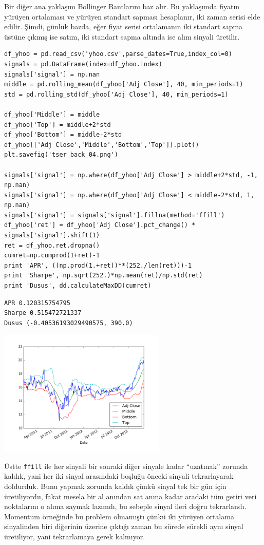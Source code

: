 \documentclass[12pt,fleqn]{article}\usepackage{../../common}
\begin{document}
Bir diğer ana yaklaşım Bollinger Bantlarını baz alır. Bu yaklaşımda fiyatın
yürüyen ortalaması ve yürüyen standart sapması hesaplanır, iki zaman serisi elde
edilir. Şimdi, günlük bazda, eğer fiyat serisi ortalamanın iki standart sapma
üstüne çıkmış ise satım, iki standart sapma altında ise alım sinyali üretilir.

\begin{verbatim}
df_yhoo = pd.read_csv('yhoo.csv',parse_dates=True,index_col=0)
signals = pd.DataFrame(index=df_yhoo.index) 
signals['signal'] = np.nan
middle = pd.rolling_mean(df_yhoo['Adj Close'], 40, min_periods=1) 
std = pd.rolling_std(df_yhoo['Adj Close'], 40, min_periods=1)

df_yhoo['Middle'] = middle
df_yhoo['Top'] = middle+2*std
df_yhoo['Bottom'] = middle-2*std
df_yhoo[['Adj Close','Middle','Bottom','Top']].plot()
plt.savefig('tser_back_04.png')

signals['signal'] = np.where(df_yhoo['Adj Close'] > middle+2*std, -1, np.nan) 
signals['signal'] = np.where(df_yhoo['Adj Close'] < middle-2*std, 1, np.nan)
signals['signal'] = signals['signal'].fillna(method='ffill')
df_yhoo['ret'] = df_yhoo['Adj Close'].pct_change() * signals['signal'].shift(1)
ret = df_yhoo.ret.dropna()
cumret=np.cumprod(1+ret)-1
print 'APR', ((np.prod(1.+ret))**(252./len(ret)))-1
print 'Sharpe', np.sqrt(252.)*np.mean(ret)/np.std(ret)
print 'Dusus', dd.calculateMaxDD(cumret)
\end{verbatim}

\begin{verbatim}
APR 0.120315754795
Sharpe 0.515472721337
Dusus (-0.40536193029490575, 390.0)
\end{verbatim}

\includegraphics[height=6cm]{tser_back_04.png}

Üstte \verb!ffill! ile her sinyali bir sonraki diğer sinyale kadar ``uzatmak''
zorunda kaldık, yani her iki sinyal arasındaki boşluğu önceki sinyali
tekrarlayarak doldurduk. Bunu yapmak zorunda kaldık çünkü sinyal tek bir gün
için üretiliyordu, fakat mesela bir al anından sat anına kadar aradaki tüm
getiri veri noktalarını o alıma saymak lazımdı, bu sebeple sinyal ileri doğru
tekrarlandı. Momentum örneğinde bu problem olmamıştı çünkü iki yürüyen ortalama
sinyalinden biri diğerinin üzerine çıktığı zaman bu sürede sürekli aynı sinyal
üretiliyor, yani tekrarlamaya gerek kalmıyor. 
\end{document}
